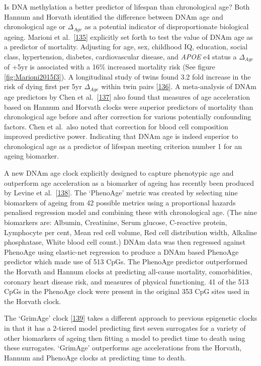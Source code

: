 \documentclass[
]{book}
\begin{document}
Is DNA methylation a better predictor of lifespan than chronological age?
Both Hannum and Horvath identified the difference between DNAm age and chronological age or \(\Delta_{Age}\) as a potential indicator of disproportionate biological ageing.
Marioni et al.~{[}\protect\hyperlink{ref-Marioni2015}{135}{]} explicitly set forth to test the value of DNAm age as a predictor of mortality.
Adjusting for age, sex, childhood IQ, education, social class, hypertension, diabetes, cardiovascular disease, and \emph{APOE} e4 status a \(\Delta_{Age}\) of +5yr is associated with a 16\% increased mortality risk (See figure \ref{fig:Marioni2015f3}).
A longitudinal study of twins found 3.2 fold increase in the risk of dying first per 5yr \(\Delta_{Age}\) within twin pairs {[}\protect\hyperlink{ref-Christiansen2016}{136}{]}.
A meta-analysis of DNAm age predictors by Chen et al.~{[}\protect\hyperlink{ref-Chen2016a}{137}{]} also found that measures of age acceleration based on Hannum and Horvath clocks were superior predictors of mortality than chronological age before and after correction for various potentially confounding factors.
Chen et al.~also noted that correction for blood cell composition improved predictive power.
Indicating that DNAm age is indeed superior to chronological age as a predictor of lifespan meeting criterion number 1 for an ageing biomarker.

A new DNAm age clock explicitly designed to capture phenotypic age and outperform age acceleration as a biomarker of ageing has recently been produced by Levine et al.~{[}\protect\hyperlink{ref-Levine2018}{138}{]}.
The `PhenoAge' metric was created by selecting nine biomarkers of ageing from 42 possible metrics using a proportional hazards penalised regression model and combining these with chronological age.
(The nine biomarkers are: Albumin, Creatinine, Serum glucose, C-reactive protein, Lymphocyte per cent, Mean red cell volume, Red cell distribution width, Alkaline phosphatase, White blood cell count.)
DNAm data was then regressed against PhenoAge using elastic-net regression to produce a DNAm based PhenoAge predictor which made use of 513 CpGs.
The PhenoAge predictor outperformed the Horvath and Hannum clocks at predicting all-cause mortality, comorbidities, coronary heart disease risk, and measures of physical functioning.
41 of the 513 CpGs in the PhenoAge clock were present in the original 353 CpG sites used in the Horvath clock.

The `GrimAge' clock {[}\protect\hyperlink{ref-Lu2019}{139}{]} takes a different approach to previous epigenetic clocks in that it has a 2-tiered model predicting first seven surrogates for a variety of other biomarkers of ageing then fitting a model to predict time to death using these surrogates.
`GrimAge' outperforms age accelerations from the Horvath, Hannum and PhenoAge clocks at predicting time to death.
\end{document}
